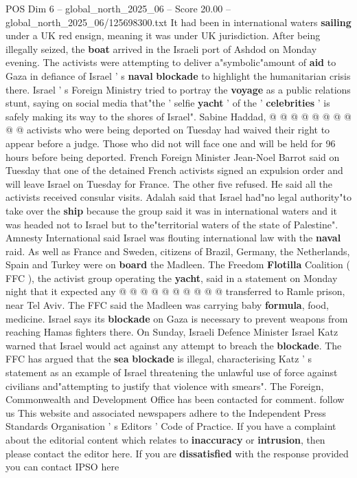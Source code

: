 \begin{textsample}{POS Dim 6 – global\_north\_2025\_06 – Score 20.00 – global\_north\_2025\_06/125698300.txt}
It had been in international waters \textbf{sailing} under a UK red ensign, meaning it was under UK jurisdiction.
After being illegally seized, the \textbf{boat} arrived in the Israeli port of Ashdod on Monday evening.
The activists were attempting to deliver a"symbolic"amount of \textbf{aid} to Gaza in defiance of Israel ' s \textbf{naval} \textbf{blockade} to highlight the humanitarian crisis there.
Israel ' s Foreign Ministry tried to portray the \textbf{voyage} as a public relations stunt, saying on social media that"the ' selfie \textbf{yacht} ' of the ' \textbf{celebrities} ' is safely making its way to the shores of Israel".
Sabine Haddad, @ @ @ @ @ @ @ @ @ @ activists who were being deported on Tuesday had waived their right to appear before a judge.
Those who did not will face one and will be held for 96 hours before being deported.
French Foreign Minister Jean-Noel Barrot said on Tuesday that one of the detained French activists signed an expulsion order and will leave Israel on Tuesday for France.
The other five refused.
He said all the activists received consular visits.
Adalah said that Israel had"no legal authority"to take over the \textbf{ship} because the group said it was in international waters and it was headed not to Israel but to the"territorial waters of the state of Palestine".
Amnesty International said Israel was flouting international law with the \textbf{naval} raid.
As well as France and Sweden, citizens of Brazil, Germany, the Netherlands, Spain and Turkey were on \textbf{board} the Madleen.
The Freedom \textbf{Flotilla} Coalition ( FFC ), the activist group operating the \textbf{yacht}, said in a statement on Monday night that it expected any @ @ @ @ @ @ @ @ @ @ transferred to Ramle prison, near Tel Aviv.
The FFC said the Madleen was carrying baby \textbf{formula}, food, medicine.
Israel says its \textbf{blockade} on Gaza is necessary to prevent weapons from reaching Hamas fighters there.
On Sunday, Israeli Defence Minister Israel Katz warned that Israel would act against any attempt to breach the \textbf{blockade}.
The FFC has argued that the \textbf{sea} \textbf{blockade} is illegal, characterising Katz ' s statement as an example of Israel threatening the unlawful use of force against civilians and"attempting to justify that violence with smears".
The Foreign, Commonwealth and Development Office has been contacted for comment. follow us This website and associated newspapers adhere to the Independent Press Standards Organisation ' s Editors ' Code of Practice.
If you have a complaint about the editorial content which relates to \textbf{inaccuracy} or \textbf{intrusion}, then please contact the editor here.
If you are \textbf{dissatisfied} with the response provided you can contact IPSO here

\end{textsample}
